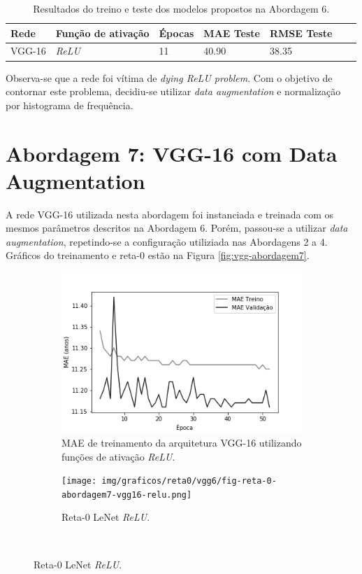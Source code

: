 \begin{table}[!ht]
	\centering
	\caption{Resultados do treino e teste dos modelos propostos na Abordagem 6.}
	\label{tab:results-6}
		\begin{tabular}{l l l l l l l}
			\toprule
			Rede & Função de ativação & Épocas & MAE Teste & RMSE Teste \\
			\midrule
			VGG-16 & \emph{ReLU} & 11 & 40.90 & 38.35 \\
			\bottomrule
		\end{tabular}
	\end{table}
	Observa-se que a rede foi vítima de \emph{dying ReLU problem}. Com o objetivo de contornar este problema, decidiu-se utilizar \emph{data augmentation} e normalização por histograma de frequência.

\section{Abordagem 7: VGG-16 com Data Augmentation}

	A rede VGG-16 utilizada nesta abordagem foi instanciada e treinada com os mesmos parâmetros descritos na Abordagem 6. Porém, passou-se a utilizar \emph{data augmentation}, repetindo-se a configuração utiliziada nas Abordagens 2 a 4. Gráficos do treinamento e reta-0 estão na Figura \ref{fig:vgg-abordagem7}.

		\begin{figure}[hb!]
			\caption{Resultados do treinamento e teste da CNN VGG-16 de acordo com a Abordagem 7.}\label{fig:vgg-abordagem7}
			\begin{subfigure}[hb]{0.5\linewidth}
				\caption{MAE de treinamento da arquitetura VGG-16 utilizando funções de ativação \emph{ReLU}.}
				\includegraphics[width=\linewidth]{img/graficos/history/vgg16/fig-history-abordagem7-vgg16-relu-mae.png}%
			\end{subfigure}%
			\begin{subfigure}[hb]{0.5\linewidth}
				\caption{Reta-0 LeNet \emph{ReLU}.}
				\texttt{[image: img/graficos/reta0/vgg6/fig-reta-0-abordagem7-vgg16-relu.png]}%
			\end{subfigure}\\
		\end{figure}


